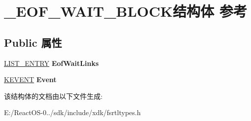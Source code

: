 \hypertarget{struct___e_o_f___w_a_i_t___b_l_o_c_k}{}\section{\+\_\+\+E\+O\+F\+\_\+\+W\+A\+I\+T\+\_\+\+B\+L\+O\+C\+K结构体 参考}
\label{struct___e_o_f___w_a_i_t___b_l_o_c_k}
\subsection*{Public 属性}
\begin{DoxyCompactItemize}
\item 
\mbox{\label{struct___e_o_f___w_a_i_t___b_l_o_c_k_ade7b675e837dcf3b5225b2a323048779}} 
\hyperlink{struct___l_i_s_t___e_n_t_r_y}{L\+I\+S\+T\+\_\+\+E\+N\+T\+RY} {\bfseries Eof\+Wait\+Links}
\item 
\mbox{\label{struct___e_o_f___w_a_i_t___b_l_o_c_k_a5a81f00f1e9cbb6f21cbba606f3b0837}} 
\hyperlink{struct___k_e_v_e_n_t}{K\+E\+V\+E\+NT} {\bfseries Event}
\end{DoxyCompactItemize}


该结构体的文档由以下文件生成\+:\begin{DoxyCompactItemize}
\item 
E\+:/\+React\+O\+S-\/0../sdk/include/xdk/fsrtltypes.\+h\end{DoxyCompactItemize}
